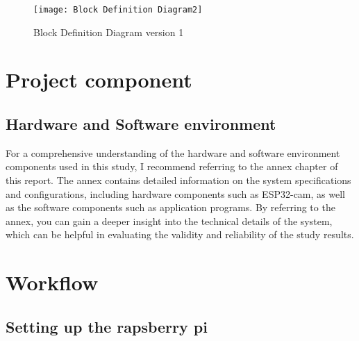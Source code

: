 \FloatBarrier
\begin{figure}[h]

         \centering
        \texttt{[image: Block Definition Diagram2]}
   
        \caption{Block Definition Diagram version 1}
        \label{Block Definition Diagram version 1}

    \end{figure}


\FloatBarrier

\section{Project component}
\subsection{Hardware and Software environment}
For a comprehensive understanding of the hardware and software environment components used in this study, I recommend referring to the annex chapter of this report. The annex contains detailed information on the system specifications and configurations, including hardware components such as ESP32-cam, as well as the software components such as  application programs. By referring to the annex, you can gain a deeper insight into the technical details of the system, which can be helpful in evaluating the validity and reliability of the study results.






\section{Workflow}
\subsection{Setting up the rapsberry pi}
